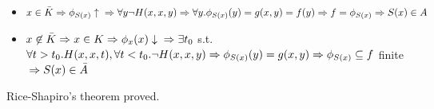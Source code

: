 \documentclass{amsbook}
\theoremstyle{definition}
\theoremstyle{remark}
\numberwithin{section}{chapter}
\numberwithin{equation}{chapter}
\begin{document}
\begin{itemize}
	\item $ x\in\bar{K}\\
		      \Rightarrow\phi_{S(x)}\uparrow \\
		      \Rightarrow\forall y\lnot H(x,x,y)\\
		      \Rightarrow \forall y.\phi_{S(x)}(y) = g(x,y) = f(y)\\
		      \Rightarrow f = \phi_{S(x)}\\ \Rightarrow S(x)\in A$
	\item $ x\not\in\bar{K}\\ \Rightarrow x\in K\\
		      \Rightarrow \phi_x(x)\downarrow\\
		      \Rightarrow \exists t_0 $ s.t. $ \forall t>t_0. H(x,x,t), \forall t<t_0. \lnot H(x,x,y)\\
		      \Rightarrow\phi_{S(x)}(y) = g(x,y)\\
		      \Rightarrow \phi_{S(x)}\subseteq f$ finite $\\
		      \Rightarrow S(x) \in \bar{A} $
\end{itemize}

Rice-Shapiro's theorem proved.
\end{document}
